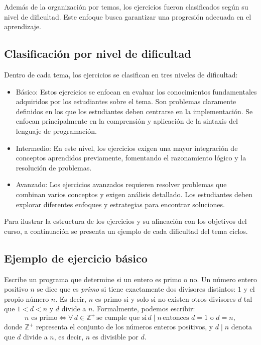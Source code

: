 \documentclass{article}
\begin{document}
Además de la organización por temas, los ejercicios fueron clasificados según su nivel de dificultad. Este enfoque busca garantizar una progresión adecuada en el aprendizaje.

\subsection{Clasificación por nivel de dificultad}  
Dentro de cada tema, los ejercicios se clasifican en tres niveles de dificultad:  
\begin{itemize}  
    \item Básico: Estos ejercicios se enfocan en evaluar los conocimientos fundamentales adquiridos por los estudiantes sobre el tema. Son problemas claramente definidos en los que los estudiantes deben centrarse en la implementación. Se enfocan principalmente en la comprensión y aplicación de la sintaxis del lenguaje de programación.
    \item Intermedio: En este nivel, los ejercicios exigen una mayor integración de conceptos aprendidos previamente, fomentando el razonamiento lógico y la resolución de problemas.
    \item Avanzado: Los ejercicios avanzados requieren resolver problemas que combinan varios conceptos y exigen análisis detallado. Los estudiantes deben explorar diferentes enfoques y estrategias para encontrar soluciones.
\end{itemize}

Para ilustrar la estructura de los ejercicios y su alineación con los objetivos del curso, a continuación se presenta un ejemplo de cada dificultad del tema ciclos.

\subsection*{Ejemplo de ejercicio básico}

Escribe un programa que determine si un entero es primo o no. Un número entero positivo \( n \) se dice que es \textit{primo} si tiene exactamente dos divisores distintos: \( 1 \) y el propio número \( n \). Es decir, \( n \) es primo si y solo si no existen otros divisores \( d \) tal que \( 1 < d < n \) y \( d \) divide a \( n \). Formalmente, podemos escribir:
\[
n \text{ es primo} \iff  \forall \, d \in \mathbb{Z}^+ \, \text{se cumple que si} \, d \mid n \, \text{entonces } d = 1 \text{ o } d = n,
\]
donde \( \mathbb{Z}^+ \) representa el conjunto de los números enteros positivos, y \( d \mid n \) denota que \( d \) divide a \( n \), es decir, \( n \) es divisible por \( d \).\\
\end{document}
